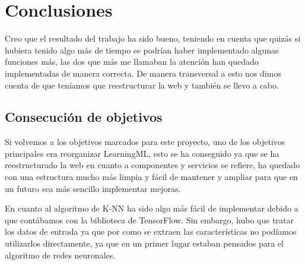 \documentclass[a4paper, 12pt]{book}
\begin{document}






\cleardoublepage
\chapter{Conclusiones}
\label{chap:conclusiones}

Creo que el resultado del trabajo ha sido bueno, teniendo en cuenta que quizás si hubiera tenido algo más de tiempo se podrían haber implementado algunas funciones más, las dos que más me llamaban la atención han quedado implementadas de manera correcta. De manera transversal a esto nos dimos cuenta de que teníamos que reestructurar la web y también se llevo a cabo.

\section{Consecución de objetivos}
\label{sec:consecucion-objetivos}

Si volvemos a los objetivos marcados para este proyecto, uno de los objetivos principales era reorganizar LearningML, esto se ha conseguido ya que se ha reestructurado la web en cuanto a componentes y servicios se refiere, ha quedado con una estructura mucho más limpia y fácil de mantener y ampliar para que en un futuro sea más sencillo implementar mejoras.

En cuanto al algoritmo de K-NN ha sido algo más fácil de implementar debido a que contábamos con la biblioteca de TensorFlow. Sin embargo, hubo que tratar los datos de entrada ya que por como se extraen las características no podíamos utilizarlos directamente, ya que en un primer lugar estaban pensados para el algoritmo de redes neuronales.
\end{document}
